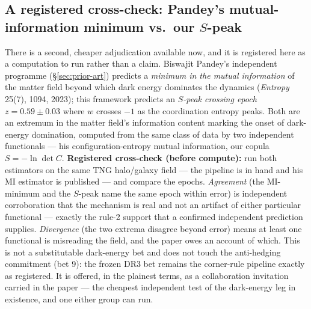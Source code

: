\documentclass[11pt,a4paper]{article}
\begin{document}
\subsection*{A registered cross-check: Pandey's mutual-information minimum vs.\ our $S$-peak}

There is a second, cheaper adjudication available now, and it is registered here as a computation to run rather than a claim. Biswajit Pandey's independent programme (\S\ref{sec:prior-art}) predicts a \emph{minimum in the mutual information} of the matter field beyond which dark energy dominates the dynamics (\emph{Entropy} 25(7), 1094, 2023); this framework predicts an \emph{$S$-peak crossing epoch} $z = 0.59 \pm 0.03$ where $w$ crosses $-1$ as the coordination entropy peaks. Both are an extremum in the matter field's information content marking the onset of dark-energy domination, computed from the same class of data by two independent functionals --- his configuration-entropy mutual information, our copula $S = -\ln\det C$. \textbf{Registered cross-check (before compute):} run both estimators on the same TNG halo/galaxy field --- the pipeline is in hand and his MI estimator is published --- and compare the epochs. \emph{Agreement} (the MI-minimum and the $S$-peak name the same epoch within error) is independent corroboration that the mechanism is real and not an artifact of either particular functional --- exactly the rule-2 support that a confirmed independent prediction supplies. \emph{Divergence} (the two extrema disagree beyond error) means at least one functional is misreading the field, and the paper owes an account of which. This is not a substitutable dark-energy bet and does not touch the anti-hedging commitment (bet 9): the frozen DR3 bet remains the corner-rule pipeline exactly as registered. It is offered, in the plainest terms, as a collaboration invitation carried in the paper --- the cheapest independent test of the dark-energy leg in existence, and one either group can run.
\end{document}
